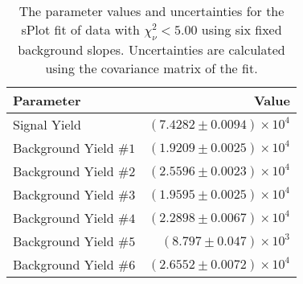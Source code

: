 
\begin{table}[ht]
    \begin{center}
        \begin{tabular}{lr}\toprule
            Parameter & Value \\\midrule
            Signal Yield & $(7.4282 \pm 0.0094) \times 10^{4}$ \\
            Background Yield $\#1$ & $(1.9209 \pm 0.0025) \times 10^{4}$ \\
            Background Yield $\#2$ & $(2.5596 \pm 0.0023) \times 10^{4}$ \\
            Background Yield $\#3$ & $(1.9595 \pm 0.0025) \times 10^{4}$ \\
            Background Yield $\#4$ & $(2.2898 \pm 0.0067) \times 10^{4}$ \\
            Background Yield $\#5$ & $(8.797 \pm 0.047) \times 10^{3}$ \\
            Background Yield $\#6$ & $(2.6552 \pm 0.0072) \times 10^{4}$ \\\bottomrule
        \end{tabular}
        \caption{The parameter values and uncertainties for the sPlot fit of data with $\chi^2_\nu < 5.00$ using six fixed background slopes. Uncertainties are calculated using the covariance matrix of the fit.}\label{tab:splot-fit-results-chisqdof-5.00-fixed-6}
    \end{center}
\end{table}
